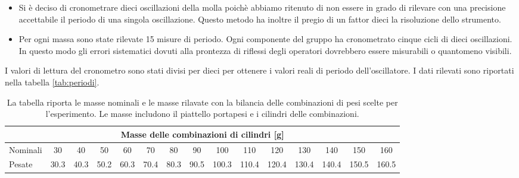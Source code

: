 \begin{itemize}
	\item{Si è deciso di cronometrare dieci oscillazioni della molla
        poichè abbiamo ritenuto di non essere in grado di rilevare con una precisione
        accettabile il periodo di una singola oscillazione. Questo metodo ha inoltre
        il pregio di un fattor dieci la risoluzione dello strumento.}

	\item{Per ogni massa sono state rilevate 15 misure di periodo.
        Ogni componente del gruppo ha cronometrato cinque cicli di dieci oscillazioni. 
        In questo modo gli errori sistematici dovuti alla prontezza di riflessi degli
        operatori dovrebbero essere misurabili o quantomeno visibili.}
\end{itemize}

I valori di lettura del cronometro sono stati divisi per dieci per ottenere i valori reali di periodo dell'oscillatore.
I dati rilevati sono riportati nella tabella \ref{tab:periodi}.

\begin{table}
    \centering
    \scriptsize
    \begin{tabular}{l | c c c c c c c c c c c c c c}
        \multicolumn{15}{c}{\small \textbf{Masse delle combinazioni di cilindri [g]}} \\[1mm]
        \toprule
        Nominali & 30 & 40 & 50 & 60 & 70 & 80& 90 & 100 & 110 & 120 & 130 & 140 & 150 & 160 \\
        Pesate & 30.3 & 40.3 & 50.2 & 60.3 & 70.4 & 80.3 & 90.5 & 100.3 & 110.4 & 120.4 & 130.4 & 140.4 & 150.5 & 160.5 \\
        \bottomrule
    \end{tabular}
    \caption{La tabella riporta le masse nominali e le masse rilavate con la bilancia delle combinazioni di pesi scelte per
    l'esperimento. Le masse includono il piattello portapesi e i cilindri delle combinazioni.}
    \label{tab:masse_dinamico}
\end{table}

